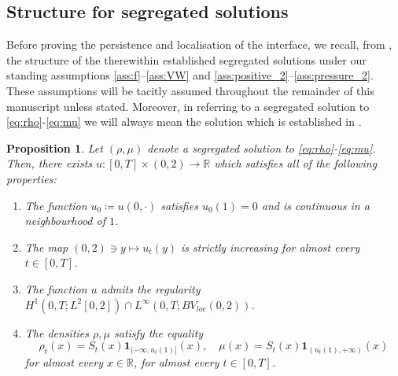 \documentclass[a4paper,twosided, 11pt]{article}
\newcommand{\R}{\mathbb{R}}
\theoremstyle{plain}
\newtheorem{proposition}[thm]{Proposition}
\theoremstyle{remark}
\newcommand{\one}{\mathbf{1}}
\numberwithin{equation}{section}
\begin{document}
\subsection{Structure for segregated solutions}
Before proving the persistence and localisation of the interface, we recall, from \cite{santambrogioschulz2026segregated}, the structure of the therewithin established segregated solutions under our standing assumptions \ref{ass:f}--\ref{ass:VW} and \ref{ass:positive_2}--\ref{ass:pressure_2}. 
These assumptions will be tacitly assumed throughout the remainder of this manuscript unless stated.
Moreover, in referring to a segregated solution to \eqref{eq:rho}-\eqref{eq:mu} we will always mean the solution which is established in \cite[Theorem 3.5]{santambrogioschulz2026segregated}.
\begin{proposition}\label{propn:segregationproperties}
Let $(\rho,\mu)$ denote a segregated solution to \eqref{eq:rho}-\eqref{eq:mu}.
Then, there exists $u \colon [0,T]\times (0,2)\to \R $ which satisfies all of the following properties:
\begin{enumerate}
\item The function $u_0 \coloneqq u(0, \cdot )$ satisfies $u_0(1) = 0$ and is continuous in a neighbourhood of $1$.
\label{Prop4}
\item The map $ (0,2) \ni y \mapsto u_t(y) $ is strictly increasing for almost every $ t \in [0,T]$. 
\label{Prop2}
\item The function $u$ admits the regularity $ H^1(0,T;L^2[0,2]) \cap L^\infty(0,T; BV_{loc}(0,2))$.
\label{Prop3}
\item The densities $\rho,\mu$ satisfy the equality \[
\rho_t(x) = S_t(x)\one_{(-\infty,u_t(1)]}(x) , \quad  \mu(x) = S_t(x)\one_{(u_t(1),+\infty)}(x)
\]
for almost every $x \in \R$, for almost every $t \in [0,T]$.
\label{Prop1}
\end{enumerate}
\end{proposition}
\end{document}

